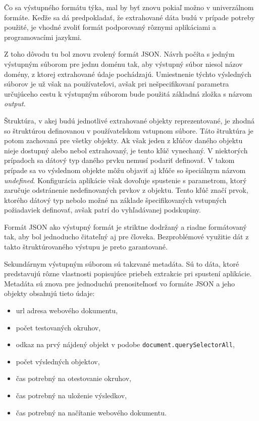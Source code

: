 Čo sa výstupného formátu týka, mal by byť znovu pokiaľ možno v univerzálnom formáte. Keďže sa dá predpokladať, že extrahované dáta budú v prípade potreby použité, je vhodné zvoliť formát podporovaný rôznymi aplikáciami a programovacími jazykmi.

Z toho dôvodu tu bol znovu zvolený formát JSON. Návrh počíta s jedným výstupným súborom pre jednu doménu tak, aby výstupný súbor niesol názov domény, z ktorej extrahované údaje pochádzajú. Umiestnenie týchto výsledných súborov je už však na používateľovi, avšak pri nešpecifikovaní parametra určujúceho cestu k výstupným súborom bude použitá základná zložka s názvom \textit{output}.

\bigskip

Štruktúra, v akej budú jednotlivé extrahované objekty reprezentované, je zhodná so štruktúrou definovanou v používateľskom vstupnom súbore. Táto štruktúra je potom zachovaná pre všetky objekty. Ak však jeden z kľúčov daného objektu nieje dostupný alebo nebol extrahovaný, je tento kľúč vynechaný. V niektorých prípadoch sa dátový typ daného prvku nemusí podariť definovať. V takom prípade sa vo výslednom objekte môžu objaviť aj kľúče so špeciálnym názvom \textit{undefined}. Konfigurácia aplikácie však dovoľuje spustenie s parametrom, ktorý zaručuje odstránenie nedefinovaných prvkov z objektu. Tento kľúč značí prvok, ktorého dátový typ nebolo možné na základe špecifikovaných vstupných požiadaviek definovať, avšak patrí do vyhľadávanej podskupiny.

Formát JSON ako výstupný formát je striktne dodržaný a riadne formátovaný tak, aby bol jednoducho čitateľný aj pre človeka. Bezproblémové využitie dát z takto štruktúrovaného výstupu je preto garantované.

\bigskip

Sekundárnym výstupným súborom sú takzvané metadáta. Sú to dáta, ktoré predstavujú rôzne vlastnosti popisujúce priebeh extrakcie pri spustení aplikácie. Metadáta sú znova pre jednoduchú prenositeľnosť vo formáte JSON a jeho objekty obsahujú tieto údaje:

\begin{itemize}
    \item url adresa webového dokumentu,
    \item počet testovaných okruhov,
    \item odkaz na prvý nájdený objekt v podobe \texttt{document.querySelectorAll},
    \item počet výsledných objektov,
    \item čas potrebný na otestovanie okruhov,
    \item čas potrebný na uloženie výsledkov,
    \item čas potrebný na načítanie webového dokumentu.
\end{itemize}

